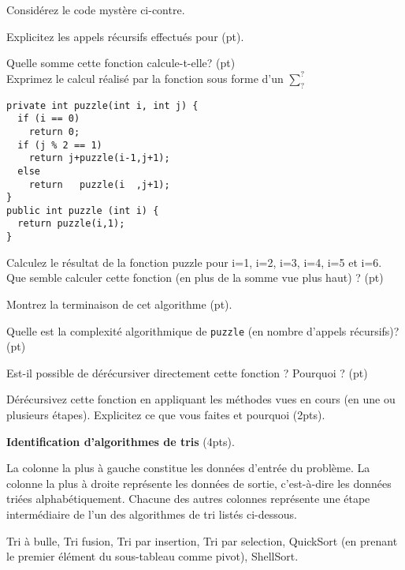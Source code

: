 \documentclass[10pt]{article}\usepackage[nu]{esial}
\begin{document}
\noindent\begin{minipage}{.65\linewidth}
Considérez le code mystère ci-contre.

\Question Explicitez les appels récursifs effectués pour 
 (\textonehalf pt).

\Question Quelle somme cette fonction calcule-t-elle? (\textonehalf pt)\\ Exprimez le calcul
réalisé par la fonction sous forme d'un $\displaystyle\sum_?^?$ 
\end{minipage}\hfill
\begin{minipage}{.33\linewidth}
\begin{Verbatim}
private int puzzle(int i, int j) {
  if (i == 0)     
    return 0;
  if (j % 2 == 1)
    return j+puzzle(i-1,j+1);
  else 
    return   puzzle(i  ,j+1);
}
public int puzzle (int i) {
  return puzzle(i,1);
}
\end{Verbatim}
\end{minipage}

\Question Calculez le résultat de la fonction puzzle pour i=1, i=2, i=3, i=4,
i=5 et i=6.\\ Que semble calculer cette fonction (en plus de la somme vue plus
haut) ? (\textonehalf pt)

\Question Montrez la terminaison de cet algorithme (\textonehalf pt).

\Question Quelle est la complexité algorithmique de \texttt{puzzle} (en
nombre d'appels récursifs)? (\textonehalf pt)

\Question Est-il possible de dérécursiver directement cette fonction ? Pourquoi
? (\textonehalf pt)

\Question Dérécursivez cette fonction en appliquant les méthodes vues en cours
(en une ou plusieurs étapes). Explicitez ce que vous faites et pourquoi (2pts).

\newpage
\Exercice\textbf{Identification d'algorithmes de tris} (4pts).

La colonne la plus à gauche constitue les données d'entrée du problème. La
colonne la plus à droite représente les données de sortie, c'est-à-dire les
données triées alphabétiquement. Chacune des autres colonnes représente une
étape intermédiaire de l'un des algorithmes de tri listés ci-dessous.

 Tri à bulle,  Tri fusion,  Tri par insertion,
 Tri par selection,  QuickSort (en prenant le premier
élément du sous-tableau comme pivot),  ShellSort.
\end{document}
